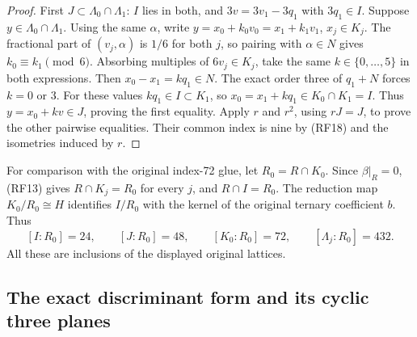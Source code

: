\begin{proof}
First $J\subset\Lambda_0\cap\Lambda_1$: $I$ lies in both,
and $3v=3v_1-3q_1$ with $3q_1\in I$.
Suppose $y\in\Lambda_0\cap\Lambda_1$.
Using the same $\alpha$, write
$y=x_0+k_0v_0=x_1+k_1v_1$, $x_j\in K_j$.
The fractional part of $(v_j,\alpha)$ is $1/6$ for both
$j$, so pairing with $\alpha\in N$ gives
$k_0\equiv k_1\pmod6$.
Absorbing multiples of $6v_j\in K_j$, take the same
$k\in\{0,\ldots,5\}$ in both expressions.
Then $x_0-x_1=kq_1\in N$.
The exact order three of $q_1+N$ forces $k=0$ or $3$.
For these values $kq_1\in I\subset K_1$, so
$x_0=x_1+kq_1\in K_0\cap K_1=I$.
Thus $y=x_0+kv\in J$, proving the first equality.
Apply $r$ and $r^2$, using $rJ=J$, to prove the other pairwise
equalities. Their common index is nine by (RF18) and the
isometries induced by $r$.
\end{proof}

For comparison with the original index-72 glue, let
$R_0=R\cap K_0$. Since $\beta|_R=0$, (RF13) gives
$R\cap K_j=R_0$ for every $j$, and $R\cap I=R_0$.
The reduction map $K_0/R_0\cong H$ identifies $I/R_0$
with the kernel of the original ternary coefficient $b$.
Thus
\[
 [I:R_0]=24,\qquad[J:R_0]=48,\qquad
 [K_0:R_0]=72,\qquad[\Lambda_j:R_0]=432.
 \tag{RF21}
\]
All these are inclusions of the displayed original lattices.

\subsection{The exact discriminant form and its cyclic three planes}

